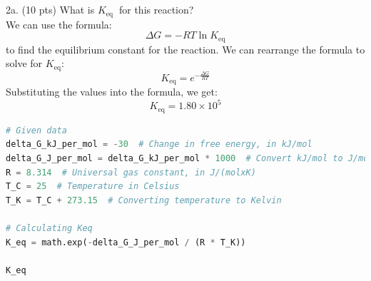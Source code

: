 \documentclass[12 pt]{article}
\begin{document}
\subsection{}
2a. (10 pts) What is $K_{\text {eq }}$ for this reaction?\\
We can use the formula:
\begin{equation}
  \Delta G = -RT \ln K_{\text{eq}}
\end{equation}
to find the equilibrium constant for the reaction. We can rearrange the formula to solve for $K_{\text{eq}}$:
\begin{equation}
  K_{\text{eq}} = e^{-\frac{\Delta G}{RT}}
\end{equation}
Substituting the values into the formula, we get:
\begin{equation}
  K_{\text{eq}} = 1.80 \times 10^{5}
\end{equation}
\begin{lstlisting}[language=Python]
# Given data
delta_G_kJ_per_mol = -30  # Change in free energy, in kJ/mol
delta_G_J_per_mol = delta_G_kJ_per_mol * 1000  # Convert kJ/mol to J/mol
R = 8.314  # Universal gas constant, in J/(molxK)
T_C = 25  # Temperature in Celsius
T_K = T_C + 273.15  # Converting temperature to Kelvin

# Calculating Keq
K_eq = math.exp(-delta_G_J_per_mol / (R * T_K))

K_eq

\end{lstlisting}
\end{document}
